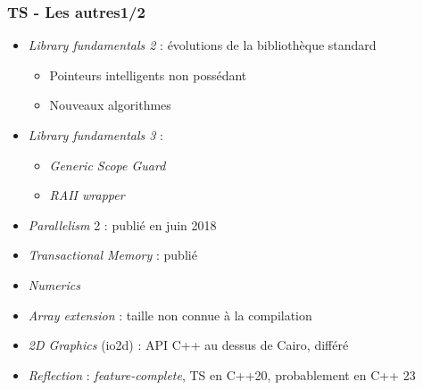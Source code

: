 \documentclass[C++.tex]{subfiles}
\begin{document}
\begin{frame}
	\frametitle{TS - Les autres\titlehfill{}1/2}
	\begin{itemize}
		\item \textit{Library fundamentals 2} : évolutions de la bibliothèque standard
		\begin{itemize}


			\item Pointeurs intelligents non possédant
			\item Nouveaux algorithmes

		\end{itemize}
		\item \textit{Library fundamentals 3} :
		\begin{itemize}
			\item \textit{Generic Scope Guard}
			\item \textit{RAII wrapper}
		\end{itemize}
	
		\item \textit{Parallelism} 2 : publié en juin 2018
		\item \textit{Transactional Memory} : publié
		\item \textit{Numerics}
		\item \textit{Array extension} : taille non connue à la compilation
		\item \textit{2D Graphics} (io2d) : API C++ au dessus de Cairo, différé

		
		\item \textit{Reflection} : \textit{feature-complete}, TS en \og C++20\fg{}, probablement en C++ 23

	\end{itemize}
\end{frame}
\end{document}
